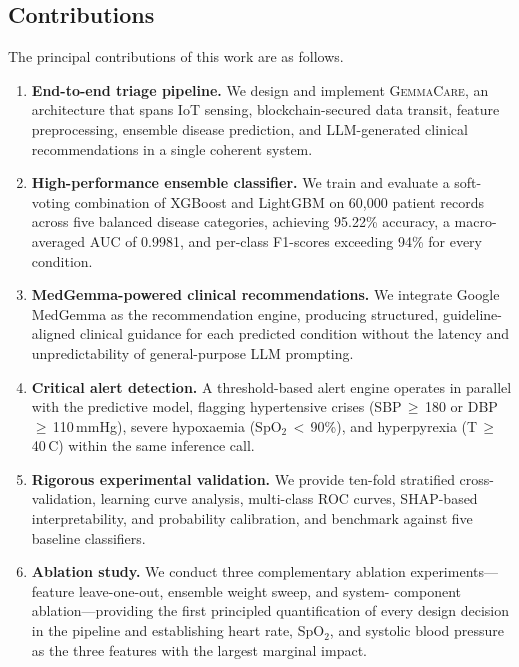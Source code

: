 \documentclass[journal]{IEEEtran}
\newcommand{\GC}{\textsc{GemmaCare}}
\begin{document}
\subsection{Contributions}

The principal contributions of this work are as follows.

\begin{enumerate}

  \item \textbf{End-to-end triage pipeline.} We design and implement
  \GC{}, an architecture that spans IoT sensing, blockchain-secured data
  transit, feature preprocessing, ensemble disease prediction, and
  LLM-generated clinical recommendations in a single coherent system.

  \item \textbf{High-performance ensemble classifier.} We train and evaluate
  a soft-voting combination of XGBoost and LightGBM on 60,000 patient
  records across five balanced disease categories, achieving 95.22\%
  accuracy, a macro-averaged AUC of 0.9981, and per-class F1-scores
  exceeding 94\% for every condition.

  \item \textbf{MedGemma-powered clinical recommendations.} We integrate
  Google MedGemma as the recommendation engine, producing structured,
  guideline-aligned clinical guidance for each predicted condition without
  the latency and unpredictability of general-purpose LLM prompting.

  \item \textbf{Critical alert detection.} A threshold-based alert engine
  operates in parallel with the predictive model, flagging hypertensive
  crises (SBP\,$\geq$\,180 or DBP\,$\geq$\,110\,mmHg), severe
  hypoxaemia (SpO$_2$\,$<$\,90\%), and hyperpyrexia
  (T\,$\geq$\,40\,\textdegree{}C) within the same inference call.

  \item \textbf{Rigorous experimental validation.} We provide ten-fold
  stratified cross-validation, learning curve analysis, multi-class ROC
  curves, SHAP-based interpretability, and probability calibration, and
  benchmark against five baseline classifiers.

  \item \textbf{Ablation study.} We conduct three complementary ablation
  experiments—feature leave-one-out, ensemble weight sweep, and system-
  component ablation—providing the first principled quantification of every
  design decision in the pipeline and establishing heart rate, SpO$_2$, and
  systolic blood pressure as the three features with the largest marginal
  impact.


\end{enumerate}
\end{document}
